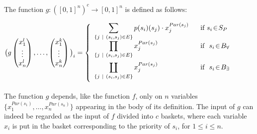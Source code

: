 \begin{definition}\label{definition_of_g}
The function $g\!:\! ([0,1]^n)^{c} \rightarrow [0,1]^n$ is defined as follows:
\begin{center}
$
\big(g\begin{pmatrix} 
x^l_1\\ 
\vdots\\
x^l_n
\end{pmatrix},\dots, \begin{pmatrix} 
x^k_1\\ 
\vdots\\
x^k_n
\end{pmatrix} \big)_i = \left\{      \begin{array}{l  l}      

									\displaystyle 	\sum_{\{ j \ \mid \ (s_i,s_j)\in E\}} p(s_i)(s_j) \cdot x^{Par(s_j)}_j \ \ & \textnormal{if }  s_i\!\in\! S_{P}\\ \vspace{5pt}
						
								\displaystyle \prod_{\{ j\  \mid \ (s_i,s_j)\in E\}} x^{Par(s_j)}_j & \textnormal{if } \  s_i\!\in\! B_{\forall}\\ \vspace{5pt}

								\displaystyle \coprod_{\{ j\  \mid\  (s_i,s_j)\in E\}} x^{Par(s_j)}_j & \textnormal{if } \  s_i\!\in\! B_{\exists}\\ 

                      	      		     \end{array}      \right.
$
\end{center}
\end{definition}

The function $g$ depends, like the function $f$,  only on $n$ variables $\{ x^{Par(s_1)}_1, \dots, x^{Par(s_n)}_n\}$ appearing in the body of its definition. The input of $g$ can indeed be regarded as the input of $f$ divided into $c$ baskets, where each variable $x_i$ is put in the basket corresponding  to the priority of $s_i$, for $1\!\leq \! i \!\leq\! n$.

